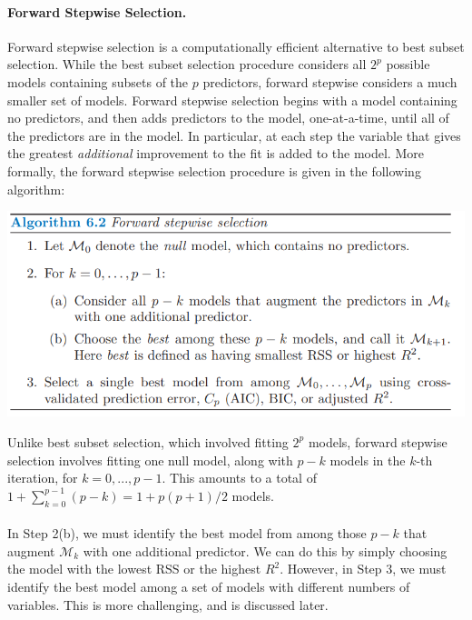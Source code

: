 \paragraph{Forward Stepwise Selection.} Forward stepwise selection is a computationally efficient alternative to best subset selection. While the best subset selection procedure considers all $2^p$ possible models containing subsets of the $p$ predictors, forward stepwise considers a much smaller set of models. Forward stepwise selection begins with a model containing no predictors, and then adds predictors to the model, one-at-a-time, until all of the predictors are in the model. In particular, at each step the variable that gives the greatest \textit{additional} improvement to the fit is added to the model. More formally, the forward stepwise selection procedure is given in the following algorithm:
\begin{center}
    \includegraphics[scale=0.7]{images/forward stepwise.png}
\end{center}
Unlike best subset selection, which involved fitting $2^p$ models, forward
stepwise selection involves fitting one null model, along with $p - k$ models
in the $k$-th iteration, for $k = 0,...,p - 1$. This amounts to a total of $1 + \sum_{k=0}^{p-1} (p-k) = 1 + p(p+1)/2$ models.\\\\
In Step 2(b),  we must identify the best model from among those $p-k$ that augment $\mathcal{M}_k$ with one additional predictor. We can do this by simply choosing the model with the lowest RSS or the highest $R^2$. However, in Step 3, we must identify the best model among a set of models with different numbers of variables. This is more challenging, and
is discussed later.

